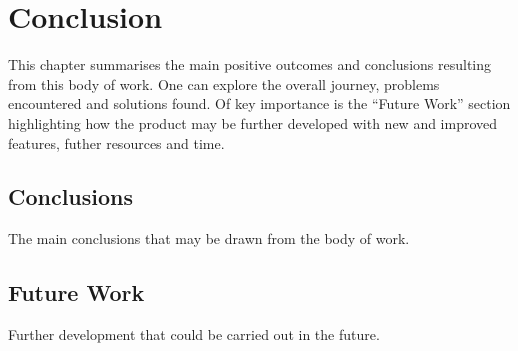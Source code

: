 \chapter{Conclusion}\label{ch:Conclusion}

This chapter summarises the main positive outcomes and conclusions resulting from this body of work. One can explore the overall journey, problems encountered and solutions found. Of key importance is the ``Future Work'' section highlighting how the product may be further developed with new and improved features, futher resources and time. 

\section{Conclusions}

The main conclusions that may be drawn from the body of work.

\section{Future Work}

Further development that could be carried out in the future.
